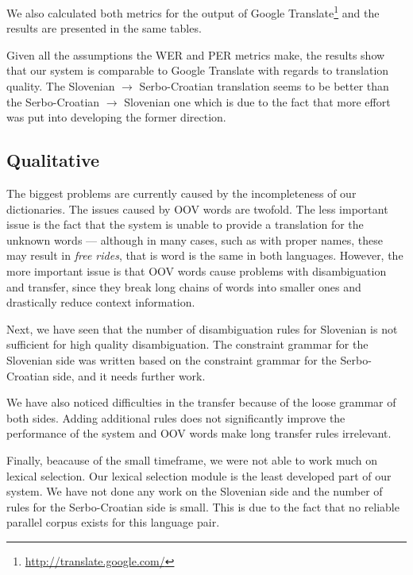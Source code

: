 We also calculated both metrics for the output of Google Translate\footnote{\url{http://translate.google.com/}} 
and the results are presented in the same tables. 

Given all the assumptions the WER and PER metrics make, the results show that our system is comparable to Google Translate
with regards to translation quality. The Slovenian $\rightarrow$ Serbo-Croatian translation seems to be better than the Serbo-Croatian $\rightarrow$ Slovenian one
which is due to the fact that more effort was put into developing the former direction.




\subsection{Qualitative}
The biggest problems are currently caused by the incompleteness of our dictionaries.
The issues caused by OOV words are twofold.
The less important issue is the fact that the system is unable to provide a translation for the unknown words ---
although in many cases, such as with proper names, these may result in \emph{free rides}, that is word
is the same in both languages.
However, the more important issue is that OOV words cause problems with disambiguation and transfer, since they
break long chains of words into smaller ones and drastically reduce context information. 

Next, we have seen that the number of disambiguation rules for Slovenian is not sufficient for high quality disambiguation. 
The constraint grammar for the Slovenian side was written based on the constraint grammar for the Serbo-Croatian side,
and it needs further work.

We have also noticed difficulties in the transfer because of the loose grammar of both sides.
Adding additional rules does not significantly improve the performance of the system 
and OOV words make long transfer rules irrelevant.

Finally, beacause of the small timeframe, we were not able to work much on lexical selection.
Our lexical selection module is the least developed part of our system. 
We have not done any work on the Slovenian side and the number of rules for the Serbo-Croatian side is small.
This is due to the fact that no reliable parallel corpus exists for this language pair.



